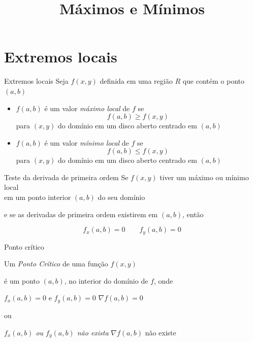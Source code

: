 \documentclass[fleqn,utf8,aspectratio=169,12pt,ignorenonframetext]{beamer}
\title{Máximos e Mínimos}
\begin{document}
\addtitle

\section{Extremos locais}

\begin{frame}{Extremos locais}
  Seja $f(x, y)$ definida em uma região $R$ que contém o ponto $(a, b)$

  \pause
  \begin{itemize}[<+->]
    \item \(f(a, b)\) é um valor \emph{máximo local} de $f$ se
          \[
            f(a, b) \geq f(x, y)
          \]
          para \((x, y)\) do domínio em um disco aberto centrado em \((a, b)\)
          \\[5mm]
    \item \(f(a, b)\) é um valor \emph{mínimo local} de $f$ se
          \[
            f(a, b) \leq f(x, y)
          \]
          para \((x, y)\) do domínio em um disco aberto centrado em \((a, b)\)
  \end{itemize}
\end{frame}

\begin{frame}{Teste da derivada de primeira ordem}
  Se $f(x, y)$ tiver um máximo ou mínimo local\\
  em um ponto interior \((a, b)\) do seu domínio

  \pause
  \vspace{0.1\baselineskip}
  e se as derivadas de primeira ordem existirem em \((a, b)\), então

  \pause
  \vspace{0.1\baselineskip}
  \[
    f_x(a, b) = 0
    \qquad
    f_y(a, b) = 0
  \]
\end{frame}

\begin{frame}{Ponto crítico}

  Um \emph{Ponto Crítico} de uma função \(f(x, y)\)

  \pause
  \vspace{0.1\baselineskip}
  é um ponto $(a, b)$, no interior do domínio de $f$, onde

  \pause
  \vspace{0.1\baselineskip}
  \emph{\(f_x(a, b) = 0\)} e \emph{\(f_y(a, b) =0\)  }
  \pause
  \tabto{70mm}
  \(\nabla f(a, b) = 0\)

  \pause
  \vspace{0.1\baselineskip}
  ou

  \emph{\(f_x(a, b)\) ou \(f_y(a, b)\) não exista}
  \pause
  \tabto{70mm}
  \(\nabla f(a, b)\) não existe

\end{frame}
\end{document}
